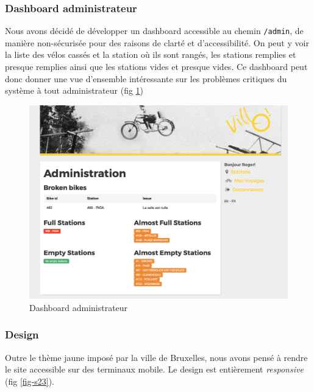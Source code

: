 \documentclass[a4paper]{article}
\begin{document}
    \subsubsection{Dashboard administrateur}
    Nous avons décidé de développer un dashboard accessible au chemin \texttt{/admin}, de manière non-sécurisée pour des raisons de clarté et d'accessibilité. On peut y voir la liste des vélos cassés et la station où ils sont rangés, les stations remplies et presque remplies ainsi que les stations vides et presque vides. Ce dashboard peut donc donner une vue d'ensemble intéressante sur les problèmes critiques du système à tout administrateur (fig \ref{fig-s22})
    
    \begin{figure}
    \includegraphics[width=\textwidth]{images/s22.png}
    \caption{Dashboard administrateur}
    \label{fig-s22}
    \end{figure}
    
    \subsubsection{Design}
    Outre le thème jaune imposé par la ville de Bruxelles, nous avons pensé à rendre le site accessible sur des terminaux mobile. Le design est entièrement \textit{responsive} (fig \ref{fig-s23}).
    
\end{document}
